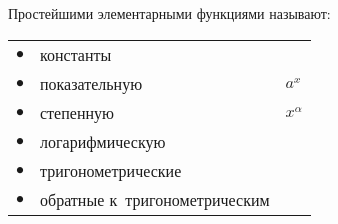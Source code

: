 
    Простейшими элементарными функциями называют:

    \begin{tabular}{lll}
        $\bullet$&константы\\
        $\bullet$&показательную& $a^x$\\
        $\bullet$&степенную &$x^\alpha$\\
        $\bullet$&логарифмическую\\
        $\bullet$&тригонометрические\\
        $\bullet$&обратные к~тригонометрическим
    \end{tabular}
